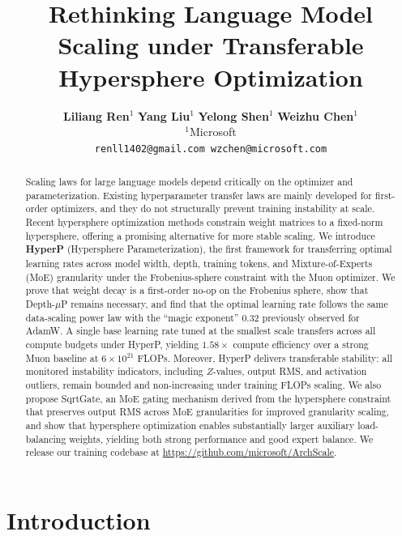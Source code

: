 \documentclass{article}
\title{ Rethinking Language Model Scaling under Transferable Hypersphere Optimization}
\author{
\textbf{Liliang Ren}$^{1}$ \quad \textbf{Yang Liu}$^{1}$ \quad
\textbf{Yelong Shen}$^{1}$ \quad \textbf{Weizhu Chen}$^{1}$  \vspace{2mm}\\
$^{1}$Microsoft \\
\texttt{renll1402@gmail.com \quad wzchen@microsoft.com}
}
\begin{document}
\maketitle


\begin{abstract}


Scaling laws for large language models depend critically on the optimizer and parameterization. Existing hyperparameter transfer laws are mainly developed for first-order optimizers, and they do not structurally prevent training instability at scale. Recent hypersphere optimization methods constrain weight matrices to a fixed-norm hypersphere, offering a promising alternative for more stable scaling.
We introduce \textbf{HyperP} (Hypersphere Parameterization), the first framework for transferring optimal learning rates across model width, depth, training tokens, and Mixture-of-Experts (MoE) granularity under the Frobenius-sphere constraint with the Muon optimizer. We prove that weight decay is a first-order no-op on the Frobenius sphere, show that Depth-$\mu$P remains necessary, and find that the optimal learning rate follows the same data-scaling power law with the ``magic exponent'' 0.32 previously observed for AdamW. A single base learning rate tuned at the smallest scale transfers across all compute budgets under HyperP, yielding $1.58\times$ compute efficiency over a strong Muon baseline at $6\times10^{21}$ FLOPs. Moreover, HyperP delivers transferable stability: all monitored instability indicators, including $Z$-values, output RMS, and activation outliers, remain bounded and non-increasing under training FLOPs scaling.
We also propose SqrtGate, an MoE gating mechanism derived from the hypersphere constraint that preserves output RMS across MoE granularities for improved granularity scaling, and show that hypersphere optimization enables substantially larger auxiliary load-balancing weights, yielding both strong performance and good expert balance. We release our training codebase at \url{https://github.com/microsoft/ArchScale}.

\end{abstract}


\section{Introduction}
\end{document}
